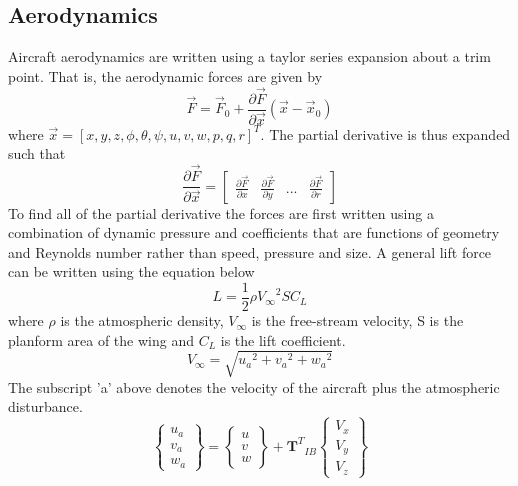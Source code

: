 \documentclass{article}
\begin{document}
\subsection{Aerodynamics}\label{s:aerodynamics}
Aircraft aerodynamics are written using a taylor series expansion
about a trim point\cite{Phillips,AndersonD}. That is, the aerodynamic forces are given by
\begin{equation}
\vec{F} = \vec{F}_0 + \frac{\partial \vec{F}}{\partial \vec{x}}(\vec{x}-\vec{x}_0)
\end{equation}
where $\vec{x} = [x,y,z,\phi,\theta,\psi,u,v,w,p,q,r]^T$. The partial
derivative is thus expanded such that
\begin{equation}
\frac{\partial \vec{F}}{\partial \vec{x}} = \begin{bmatrix} \frac{\partial
    \vec{F}}{\partial x} & \frac{\partial \vec{F}}{\partial y} & ... &
  \frac{\partial \vec{F}}{\partial r} \end{bmatrix}
\end{equation}
To find all of the partial derivative the forces are first written
using a combination of dynamic pressure and coefficients that are
functions of geometry and Reynolds number rather than speed, pressure
and size. A general lift force can be written using the equation below
\begin{equation}
L = \frac{1}2\rho {V_{\infty}}^2 S C_L
\end{equation}
where $\rho$ is the atmospheric density, $V_{\infty}$ is the
free-stream velocity, S is the planform area of the wing and $C_L$ is
the lift coefficient. 
\begin{equation}\label{e:vtotal}
  V_{\infty} = \sqrt{{u_a}^2 + {v_a}^2 + {w_a}^2}
\end{equation}
The subscript 'a' above denotes the velocity of the aircraft plus the
atmospheric disturbance. 
\begin{equation}\label{e:atm}
\begin{Bmatrix} u_a \\ v_a \\ w_a \end{Bmatrix} =
\begin{Bmatrix} u \\ v \\ w \end{Bmatrix} +
{\textbf{T}^T}_{IB} \begin{Bmatrix}
 V_x \\ V_y \\ V_z \end{Bmatrix}
\end{equation}
\end{document}
